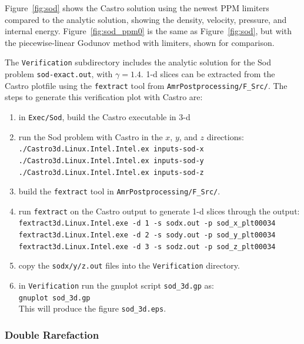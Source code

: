 Figure~\ref{fig:sod} shows the Castro solution using the newest PPM limiters
compared to the analytic 
solution, showing the density, velocity, pressure, and internal energy.
Figure~\ref{fig:sod_ppm0} is the same as Figure~\ref{fig:sod},
but with the piecewise-linear Godunov method with limiters, 
shown for comparison.

The {\tt Verification} subdirectory includes the analytic solution for
the Sod problem {\tt sod-exact.out}, with $\gamma = 1.4$.  1-d slices
can be extracted from the Castro plotfile using the {\tt fextract} tool
from {\tt AmrPostprocessing/F_Src/}.  
The steps to generate this verification plot with Castro are:
\begin{enumerate}
\item in {\tt Exec/Sod}, build the Castro executable in 3-d
\item run the Sod problem with Castro in the $x$, $y$, and $z$ directions: \\
 {\tt ./Castro3d.Linux.Intel.Intel.ex inputs-sod-x} \\
 {\tt ./Castro3d.Linux.Intel.Intel.ex inputs-sod-y} \\
 {\tt ./Castro3d.Linux.Intel.Intel.ex inputs-sod-z}
\item build the {\tt fextract} tool in {\tt AmrPostprocessing/F_Src/}.  
\item run {\tt fextract} on the Castro output to generate 1-d slices
 through the output: \\
 {\tt fextract3d.Linux.Intel.exe -d 1 -s sodx.out -p sod\_x\_plt00034} \\
 {\tt fextract3d.Linux.Intel.exe -d 2 -s sody.out -p sod\_y\_plt00034} \\
 {\tt fextract3d.Linux.Intel.exe -d 3 -s sodz.out -p sod\_z\_plt00034}
\item copy the {\tt sodx/y/z.out} files into the {\tt Verification} directory.
\item in {\tt Verification} run the gnuplot script {\tt sod\_3d.gp} as: \\
 {\tt gnuplot sod\_3d.gp} \\
 This will produce the figure {\tt sod\_3d.eps}.
\end{enumerate}

\subsubsection{Double Rarefaction}

